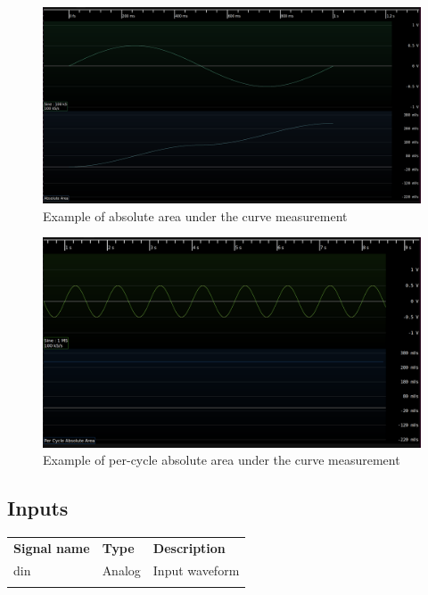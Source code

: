 \begin{figure}[h]
\centering
\includegraphics[width=16cm]{images/filters/absolute-area.png}
\caption{Example of absolute area under the curve measurement}
\end{figure}

\pagebreak

\begin{figure}[h]
\centering
\includegraphics[width=16cm]{images/filters/per-cycle-absolute-area.png}
\caption{Example of per-cycle absolute area under the curve measurement}
\end{figure}

\subsection{Inputs}

\begin{tabularx}{16cm}{llX}
\thickhline
\textbf{Signal name} & \textbf{Type} & \textbf{Description} \\
\thickhline
din & Analog & Input waveform \\
\thickhline
\end{tabularx}

